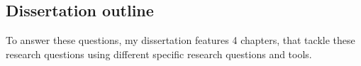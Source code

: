 {}
\subsection*{Dissertation outline}


To answer these questions, my dissertation features 4 chapters, that tackle these research questions using different specific research questions and tools. 


